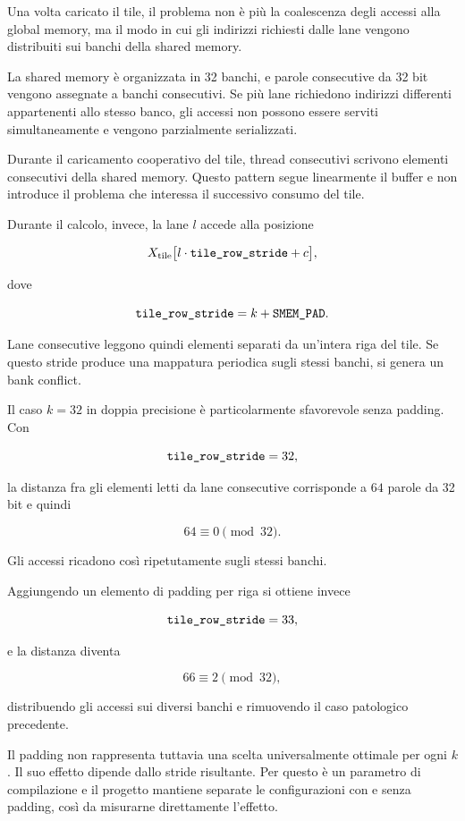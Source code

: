 Una volta caricato il tile, il problema non è più la coalescenza degli
accessi alla global memory, ma il modo in cui gli indirizzi richiesti dalle
lane vengono distribuiti sui banchi della shared memory.

La shared memory è organizzata in 32 banchi, e parole consecutive da
32 bit vengono assegnate a banchi consecutivi. Se più lane richiedono
indirizzi differenti appartenenti allo stesso banco, gli accessi non
possono essere serviti simultaneamente e vengono parzialmente
serializzati.

Durante il caricamento cooperativo del tile, thread consecutivi scrivono
elementi consecutivi della shared memory. Questo pattern segue
linearmente il buffer e non introduce il problema che interessa il
successivo consumo del tile.

Durante il calcolo, invece, la lane $l$ accede alla posizione

\[
X_{\mathrm{tile}}
\bigl[l\cdot\texttt{tile\_row\_stride}+c\bigr],
\]

dove

\[
\texttt{tile\_row\_stride}
=
k+\texttt{SMEM\_PAD}.
\]

Lane consecutive leggono quindi elementi separati da un'intera riga del
tile. Se questo stride produce una mappatura periodica sugli stessi banchi,
si genera un bank conflict.

Il caso $k=32$ in doppia precisione è particolarmente sfavorevole senza
padding. Con

\[
\texttt{tile\_row\_stride}=32,
\]

la distanza fra gli elementi letti da lane consecutive corrisponde a
$64$ parole da 32 bit e quindi

\[
64 \equiv 0 \pmod{32}.
\]

Gli accessi ricadono così ripetutamente sugli stessi banchi.

Aggiungendo un elemento di padding per riga si ottiene invece

\[
\texttt{tile\_row\_stride}=33,
\]

e la distanza diventa

\[
66 \equiv 2 \pmod{32},
\]

distribuendo gli accessi sui diversi banchi e rimuovendo il caso
patologico precedente.

Il padding non rappresenta tuttavia una scelta universalmente ottimale
per ogni $k$. Il suo effetto dipende dallo stride risultante. Per questo
 è un parametro di compilazione e il progetto mantiene
separate le configurazioni con e senza padding, così da misurarne
direttamente l'effetto.

